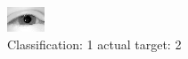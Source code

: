 \begin{figure}[h!]
\begin{center}
\includegraphics[width=0.60\columnwidth]{figures/ID2281_class_1_target_2.png}
\end{center}
\caption{ Classification: 1 actual target: 2}
\label{fig:ID2281_class_1_target_2}
\end{figure}
